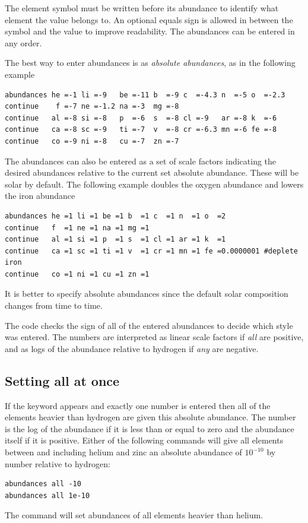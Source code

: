 The element symbol must be written before its abundance to identify
what element the value belongs to. An optional equals sign is allowed
in between the symbol and the value to improve readability.
The abundances can be entered in any order.

The best way to enter abundances is as \emph{absolute abundances},
as in the following example
\begin{verbatim}
abundances he =-1 li =-9   be =-11 b  =-9 c  =-4.3 n  =-5 o  =-2.3
continue    f =-7 ne =-1.2 na =-3  mg =-8
continue   al =-8 si =-8   p  =-6  s  =-8 cl =-9   ar =-8 k  =-6
continue   ca =-8 sc =-9   ti =-7  v  =-8 cr =-6.3 mn =-6 fe =-8
continue   co =-9 ni =-8   cu =-7  zn =-7
\end{verbatim}
The abundances can also be entered as a set of scale factors indicating
the desired abundances relative to the current set absolute abundance.
These will be solar by default.
The following example doubles the oxygen
abundance and lowers the iron abundance
\begin{verbatim}
abundances he =1 li =1 be =1 b  =1 c  =1 n  =1 o  =2
continue   f  =1 ne =1 na =1 mg =1
continue   al =1 si =1 p  =1 s  =1 cl =1 ar =1 k  =1
continue   ca =1 sc =1 ti =1 v  =1 cr =1 mn =1 fe =0.0000001 #deplete iron
continue   co =1 ni =1 cu =1 zn =1
\end{verbatim}
It is better to specify absolute abundances since the default solar
composition changes from time to time.

The code checks the sign of all of the entered abundances to decide
which style was entered.
The numbers are interpreted as linear scale factors
if \emph{all} are positive,
and as logs of the abundance relative to hydrogen if
\emph{any} are negative.

\subsection{Setting all at once}

If the keyword  appears and exactly one number
is entered then all
of the elements heavier than hydrogen are given this absolute abundance.
The number is the log of the abundance if it is less than or equal to zero
and the abundance itself if it is positive.
Either of the following commands
will give all elements between and including helium and zinc an absolute
abundance of $10^{-10}$ by number relative to hydrogen:
\begin{verbatim}
abundances all -10
abundances all 1e-10
\end{verbatim}
The  command will set abundances
of all elements heavier than helium.


